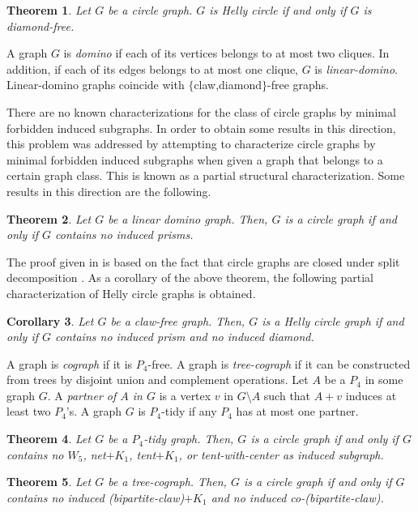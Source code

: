 \documentclass[12pt]{book}
\theoremstyle{plain}
\newtheorem{teo}{Theorem}[chapter]
\newtheorem{cor}[teo]{Corollary}
\theoremstyle{remark}
\begin{document}
\begin{teo} \cite{DGR10} 
Let $G$ be a circle graph. $G$ is Helly circle if and only if $G$ is diamond-free.
\end{teo}

A graph $G$ is \emph{domino }if each of its vertices belongs to at most
two cliques. In addition, if each of its edges belongs to at most one
clique, $G$ is \emph{linear-domino}. Linear-domino graphs coincide with
$\{$claw,diamond$\}$-free graphs.


There are no known characterizations for the class of circle graphs by minimal forbidden induced subgraphs. In order to obtain some results in this direction, this problem was addressed by attempting to characterize circle graphs by minimal forbidden induced subgraphs when given a graph that belongs to a certain graph class. This is known as a partial structural characterization. 
Some results in this direction are the following.

\begin{teo}\cite{BDGS10}
Let $G$ be a linear domino graph. Then, $G$ is a circle graph if and only if $G$ contains no induced prisms.
\end{teo}

The proof given in \cite{BDGS10} is based on the fact that circle graphs are closed under split decomposition \cite{B87}. As a corollary of
the above theorem, the following partial characterization of Helly circle graphs is obtained.

\begin{cor} \cite{BDGS10}
Let $G$ be a claw-free graph. Then, $G$ is a Helly circle graph if and only if $G$ contains no induced prism and no induced diamond.
\end{cor}

A graph is \emph{cograph} if it is $P_4$-free. 
A graph is \emph{tree-cograph} if it can be constructed from trees by disjoint union and complement operations.
Let $A$ be a $P_4$ in some graph $G$. A \emph{partner of $A$ in $G$ }is a vertex $v$ in $G\setminus A$ such that $A+v$ induces at least two $P_4$'s. A graph $G$ is $P_4$-tidy if any $P_4$ has at most one partner.

\begin{teo} \cite{BDGS10} 
Let $G$ be a $P_4$-tidy graph. Then, $G$ is a circle graph if and only if $G$ contains no $W_5$, net$+K_1$, tent$+K_1$, or tent-with-center as induced subgraph.
\end{teo}

\begin{teo} \cite{BDGS10} 
Let $G$ be a tree-cograph. Then, $G$ is a circle graph if and only if $G$ contains no induced (bipartite-claw)$+K_1$ and no induced co-(bipartite-claw).
\end{teo}
\end{document}
